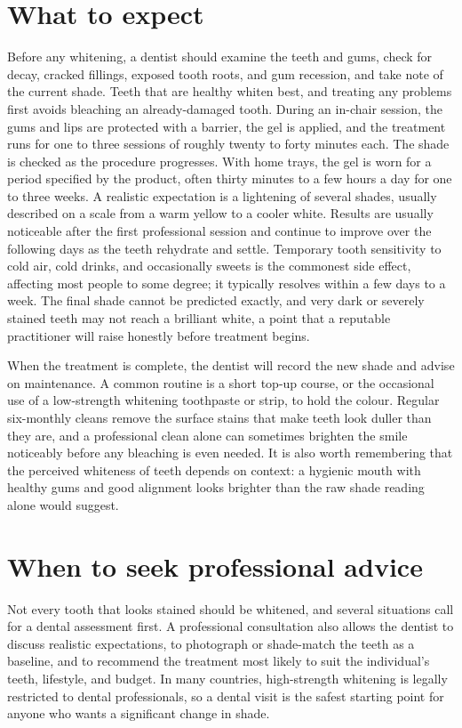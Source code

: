 \section*{What to expect}
Before any whitening, a dentist should examine the teeth and gums, check for decay, cracked fillings, exposed tooth roots, and gum recession, and take note of the current shade. Teeth that are healthy whiten best, and treating any problems first avoids bleaching an already-damaged tooth. During an in-chair session, the gums and lips are protected with a barrier, the gel is applied, and the treatment runs for one to three sessions of roughly twenty to forty minutes each. The shade is checked as the procedure progresses. With home trays, the gel is worn for a period specified by the product, often thirty minutes to a few hours a day for one to three weeks. A realistic expectation is a lightening of several shades, usually described on a scale from a warm yellow to a cooler white. Results are usually noticeable after the first professional session and continue to improve over the following days as the teeth rehydrate and settle. Temporary tooth sensitivity to cold air, cold drinks, and occasionally sweets is the commonest side effect, affecting most people to some degree; it typically resolves within a few days to a week. The final shade cannot be predicted exactly, and very dark or severely stained teeth may not reach a brilliant white, a point that a reputable practitioner will raise honestly before treatment begins.

When the treatment is complete, the dentist will record the new shade and advise on maintenance. A common routine is a short top-up course, or the occasional use of a low-strength whitening toothpaste or strip, to hold the colour. Regular six-monthly cleans remove the surface stains that make teeth look duller than they are, and a professional clean alone can sometimes brighten the smile noticeably before any bleaching is even needed. It is also worth remembering that the perceived whiteness of teeth depends on context: a hygienic mouth with healthy gums and good alignment looks brighter than the raw shade reading alone would suggest.

\section*{When to seek professional advice}
Not every tooth that looks stained should be whitened, and several situations call for a dental assessment first. A professional consultation also allows the dentist to discuss realistic expectations, to photograph or shade-match the teeth as a baseline, and to recommend the treatment most likely to suit the individual's teeth, lifestyle, and budget. In many countries, high-strength whitening is legally restricted to dental professionals, so a dental visit is the safest starting point for anyone who wants a significant change in shade.

